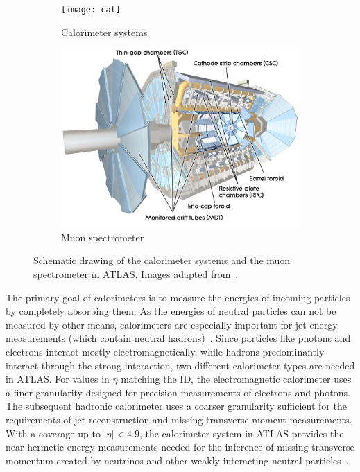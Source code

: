 \begin{figure}
	\centering
	\begin{subfigure}[b]{0.45\linewidth}
		\centering\texttt{[image: cal]}
		\caption{Calorimeter systems\label{fig:calorimeters}}
	\end{subfigure}%
	\begin{subfigure}[b]{0.45\linewidth}
		\centering\includegraphics[width=\textwidth]{ms}
		\caption{Muon spectrometer\label{fig:muon_system}}
	\end{subfigure}%
	\caption{Schematic drawing of the calorimeter systems and the muon spectrometer in ATLAS. Images adapted from~\cite{Pequenao:1095927,Pequenao:1095929}.}\label{fig:cal_ms_schematic}
\end{figure}

The primary goal of calorimeters is to measure the energies of incoming particles by completely absorbing them. As the energies of neutral particles can not be measured by other means, calorimeters are especially important for jet energy measurements (which contain neutral hadrons)~\cite{Brock:1354959}. Since particles like photons and electrons interact mostly electromagnetically, while hadrons predominantly interact through the strong interaction, two different calorimeter types are needed in ATLAS. For values in $\eta$ matching the ID, the electromagnetic calorimeter uses a finer granularity designed for precision measurements of electrons and photons. The subsequent hadronic calorimeter uses a coarser granularity sufficient for the requirements of jet reconstruction and missing transverse moment measurements. With a coverage up to $\vert\eta\vert <4.9$, the calorimeter system in ATLAS provides the near hermetic energy measurements needed for the inference of missing transverse momentum created by neutrinos and other weakly interacting neutral particles~\cite{Aad:2008zzm}.


